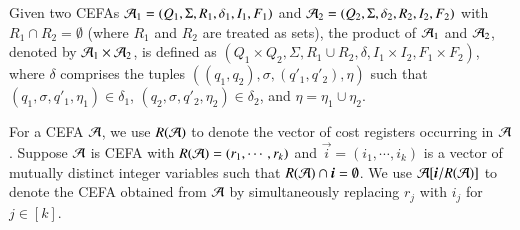 %


Given two CEFAs $\mathcal{A}_1 = ( Q_1, \Sigma, R_1, \delta_1, I_1, F_1)$ and $\mathcal{A}_2 = (Q_2, \Sigma, \delta_2, R_2, I_2, F_2)$ with $R_1 \cap R_2 = \emptyset$ (where %
$R_1$ and $R_2$ are treated as sets), the product of $\mathcal{A}_1$ and $\mathcal{A}_2$, denoted by $\mathcal{A}_1 \times \mathcal{A}_2$, is defined as $(Q_1 \times Q_2, \Sigma, R_1 \cup R_2, \delta, I_1 \times I_2, F_1 \times F_2)$, where $\delta$ comprises the tuples $((q_1, q_2), \sigma, (q'_1, q'_2), \eta)$ such that $(q_1, \sigma, q'_1, \eta_1) \in \delta_1$, $(q_2, \sigma, q'_2, \eta_2) \in \delta_2$, and $\eta = \eta_1\cup \eta_2$.  %


For a CEFA $\mathcal{A}$, we use $R(\mathcal{A})$ to denote the vector of cost registers occurring in $\mathcal{A}$. %
Suppose $\mathcal{A}$ is  CEFA with $R(\mathcal{A})=(r_1,\cdots, r_k)$ and $\vec{i} = (i_1,\cdots, i_k)$ is a vector of mutually distinct integer variables such that $R(\NFA) \cap \vec{i} = \emptyset$. We use $\CEFA[\vec{i}/R(\CEFA)]$ to denote the CEFA obtained from $\mathcal{A}$ by simultaneously replacing $r_j$ with $i_j$ for $j \in [k]$. 

